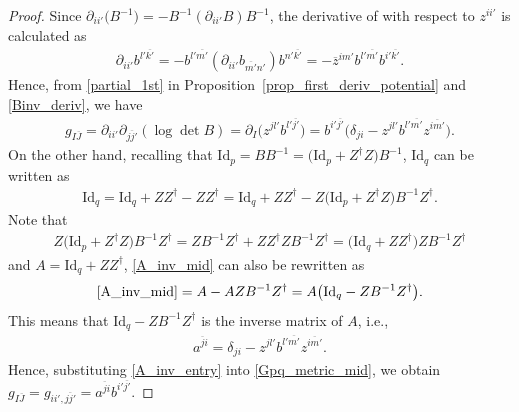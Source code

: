 \documentclass[pdftex]{sigma}
\numberwithin{equation}{section}
\begin{document}
\begin{proof}
Since
$
 \partial_{ii'}
 \bigl(
 B^{-1}
 \bigr)
 =
 -
 B^{-1}
 (
 \partial_{ii'}
 B
 )
 B^{-1}
$,
the derivative of  with respect to $z^{ii'}$ is calculated as
\begin{align}
 \partial_{ii'}
 b^{l'\overline{k'}}
 =
 -
 b^{l'\overline{m'}}
 (
 \partial_{ii'}
 b_{\overline{m'}n'}
 )
 b^{n'\overline{k'}}=
 -
 \overline{z}^{im'}
 b^{l'\overline{m'}}
 b^{i'\overline{k'}}.
 \label{Binv_deriv}
\end{align}
Hence, from \eqref{partial_1st} in Proposition~\ref{prop_first_deriv_potential} and \eqref{Binv_deriv}, we have
\begin{align}
 g_{I\overline{J}}
 =
 \partial_{ii'}
 \partial_{\overline{jj'}}
 (
 \log
 \det
 B
 )
 =
 \partial_{I}
 \bigl(
 z^{jl'}
 b^{l'\overline{j'}}
 \bigr)
 =
 b^{i'\overline{j'}}
 \bigl(
 \delta_{ji}
 -
 z^{jl'}
 b^{l'\overline{m'}}
 z^{\overline{im'}}
 \bigr).
 \label{Gpq_metric_mid}
\end{align}
On the other hand, recalling that
$
 \mathrm{Id}_{p}
 =
 BB^{-1}
 =
 \bigl(
 \mathrm{Id}_{p}
 +
 Z^{\dagger}
 Z
 \bigr)
 B^{-1}
$,
$\mathrm{Id}_{q}$ can be written as
\begin{align}
 \mathrm{Id}_{q}= \mathrm{Id}_{q} + ZZ^{\dagger} - ZZ^{\dagger}
= \mathrm{Id}_{q} + ZZ^{\dagger} - Z \bigl( \mathrm{Id}_{p} + Z^{\dagger} Z \bigr) B^{-1} Z^{\dagger} . \label{A_inv_mid}
\end{align}
Note that
\begin{align*}
 Z\bigl( \mathrm{Id}_{p} + Z^{\dagger} Z\bigr) B^{-1} Z^{\dagger} =
 Z B^{-1} Z^{\dagger} + Z Z^{\dagger} Z B^{-1} Z^{\dagger}
 =\bigl( \mathrm{Id}_{q} + Z Z^{\dagger} \bigr) Z B^{-1} Z^{\dagger}
\end{align*}
and
$ A = \mathrm{Id}_{q} + Z Z^{\dagger}$,
\eqref{A_inv_mid} can also be rewritten as
\begin{align*}
 \eqref{A_inv_mid}= A - A Z B^{-1} Z^{\dagger}= A \bigl( \mathrm{Id}_{q} - Z B^{-1} Z^{\dagger} \bigr).
\end{align*}
This means that
$ \mathrm{Id}_{q} - Z B^{-1} Z^{\dagger}$ is the inverse matrix of $A$, i.e.,
\begin{align}
 a^{\overline{j}i}
 =
 \delta_{ji}
 -
 z^{jl'}
 b^{l'\overline{m'}}
 z^{\overline{im'}}
 .
 \label{A_inv_entry}
\end{align}
Hence, substituting \eqref{A_inv_entry} into \eqref{Gpq_metric_mid}, we obtain
$
 g_{I\overline{J}}
 =
 g_{ii',\overline{jj'}}
 =
 a^{\overline{j}i}
 b^{i'\overline{j'}}
$.
\end{proof}
\end{document}

